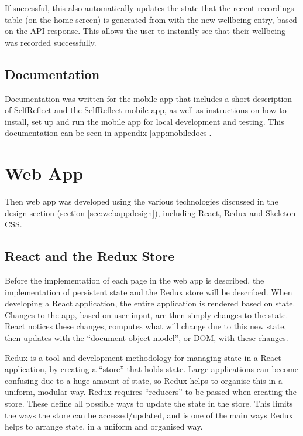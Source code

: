 \documentclass[11pt,openright,a4paper]{report}
\begin{document}
If successful, this also automatically updates the state that the recent recordings table (on the home screen) is generated from with the new wellbeing entry, based on the API response. This allows the user to instantly see that their wellbeing was recorded successfully.

\subsection{Documentation}
Documentation was written for the mobile app that includes a short description of SelfReflect and the SelfReflect mobile app, as well as instructions on how to install, set up and run the mobile app for local development and testing. This documentation can be seen in appendix \ref{app:mobiledocs}.

\section{Web App}
Then web app was developed using the various technologies discussed in the design section (section \ref{sec:webappdesign}), including React, Redux and Skeleton CSS.

\subsection{React and the Redux Store}
Before the implementation of each page in the web app is described, the implementation of persistent state and the Redux store will be described. When developing a React application, the entire application is rendered based on state. Changes to the app, based on user input, are then simply changes to the state. React notices these changes, computes what will change due to this new state, then updates with the \enquote{document object model}, or DOM, with these changes.

Redux is a tool and development methodology for managing state in a React application, by creating a \enquote{store} that holds state. Large applications can become confusing due to a huge amount of state, so Redux helps to organise this in a uniform, modular way. Redux requires \enquote{reducers} to be passed when creating the store. These define all possible ways to update the state in the store. This limits the ways the store can be accessed/updated, and is one of the main ways Redux helps to arrange state, in a uniform and organised way.
\end{document}
